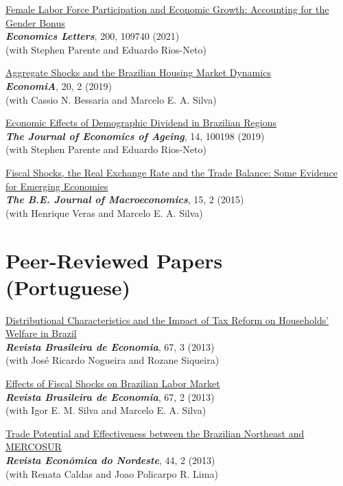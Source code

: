 \documentclass[mm, 10pt]{simple_style}
\begin{document}
\begin{resume}
\href{https://doi.org/10.1016/j.econlet.2021.109740}{Female Labor Force Participation and Economic Growth: Accounting for the Gender Bonus}  \\
 \textbf{\textit{Economics Letters}}, 200, 109740 (2021)  \\ 
(with Stephen Parente and Eduardo Rios-Neto)

\href{https://doi.org/10.1016/j.econ.2019.08.001}{Aggregate Shocks and the Brazilian Housing Market Dynamics} \\
\textbf{\textit{EconomiA}}, 20, 2 (2019) \\
(with Cassio N. Bessaria and Marcelo E. A. Silva)

\href{https://doi.org/10.1016/j.jeoa.2019.100198}{Economic Effects of Demographic Dividend in Brazilian Regions} \\
\textbf{\textit{The Journal of Economics of Ageing}}, 14, 100198 (2019)  \\
(with Stephen Parente and Eduardo Rios-Neto)

\href{https://doi.org/10.1515/bejm-2014-0018}{Fiscal Shocks, the Real Exchange Rate and the Trade Balance: Some Evidence for Emerging Economies} \\
\textbf{\textit{The B.E. Journal of Macroeconomics}}, 15, 2 (2015)  \\
(with Henrique Veras and Marcelo E. A. Silva)


\section{Peer-Reviewed Papers\\ (Portuguese)}

\href{http://bibliotecadigital.fgv.br/ojs/index.php/rbe/article/view/6159}{Distributional Characteristics and the Impact of Tax Reform on Households’ Welfare in Brazil}  \\
\textbf{\textit{Revista Brasileira de Economia}}, 67, 3 (2013) \\
(with Jos\'e Ricardo Nogueira and Rozane Siqueira) 


\href{http://bibliotecadigital.fgv.br/ojs/index.php/rbe/article/view/3890}{Effects of Fiscal Shocks on Brazilian Labor Market} \\
\textbf{\textit{Revista Brasileira de Economia}}, 67, 2 (2013) \\
(with Igor E. M. Silva and Marcelo E. A. Silva) 

\href{https://www.bnb.gov.br/revista/index.php/ren/article/view/78/58}{Trade Potential and Effectiveness between the Brazilian Northeast and MERCOSUR} \\
\textbf{\textit{Revista Econ\^omica do Nordeste}}, 44, 2 (2013) \\
(with Renata Caldas and Joao Policarpo R. Lima) 


\end{resume}
\end{document}
